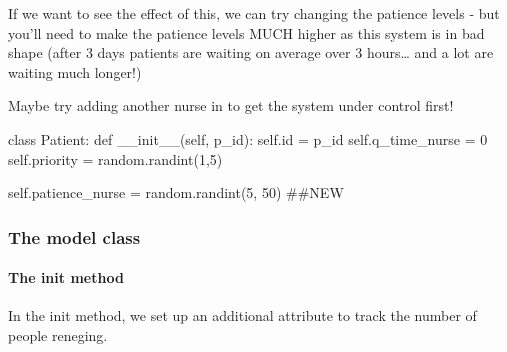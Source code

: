 \documentclass[
  letterpaper,
  DIV=11,
  numbers=noendperiod]{scrreprt}
\let\oldparagraph\paragraph
\renewcommand{\paragraph}[1]{\oldparagraph{#1}\mbox{}}
\newenvironment{Shaded}{\begin{snugshade}}{\end{snugshade}}
\newcommand{\BuiltInTok}[1]{\textcolor[rgb]{0.00,0.23,0.31}{#1}}
\newcommand{\CommentTok}[1]{\textcolor[rgb]{0.37,0.37,0.37}{#1}}
\newcommand{\DecValTok}[1]{\textcolor[rgb]{0.68,0.00,0.00}{#1}}
\newcommand{\FunctionTok}[1]{\textcolor[rgb]{0.28,0.35,0.67}{#1}}
\newcommand{\KeywordTok}[1]{\textcolor[rgb]{0.00,0.23,0.31}{#1}}
\newcommand{\NormalTok}[1]{\textcolor[rgb]{0.00,0.23,0.31}{#1}}
\newcommand{\OperatorTok}[1]{\textcolor[rgb]{0.37,0.37,0.37}{#1}}
\newcommand{\VariableTok}[1]{\textcolor[rgb]{0.07,0.07,0.07}{#1}}
\begin{document}
If we want to see the effect of this, we can try changing the patience
levels - but you'll need to make the patience levels MUCH higher as this
system is in bad shape (after 3 days patients are waiting on average
over 3 hours\ldots{} and a lot are waiting much longer!)

Maybe try adding another nurse in to get the system under control first!

\begin{Shaded}
\begin{Highlighting}[]
\KeywordTok{class}\NormalTok{ Patient:}
    \KeywordTok{def} \FunctionTok{\_\_init\_\_}\NormalTok{(}\VariableTok{self}\NormalTok{, p\_id):}
        \VariableTok{self}\NormalTok{.}\BuiltInTok{id} \OperatorTok{=}\NormalTok{ p\_id}
        \VariableTok{self}\NormalTok{.q\_time\_nurse }\OperatorTok{=} \DecValTok{0}
        \VariableTok{self}\NormalTok{.priority }\OperatorTok{=}\NormalTok{ random.randint(}\DecValTok{1}\NormalTok{,}\DecValTok{5}\NormalTok{)}

        \VariableTok{self}\NormalTok{.patience\_nurse }\OperatorTok{=}\NormalTok{ random.randint(}\DecValTok{5}\NormalTok{, }\DecValTok{50}\NormalTok{) }\CommentTok{\#\#NEW}
\end{Highlighting}
\end{Shaded}

\subsubsection{The model class}\label{the-model-class-4}

\paragraph{\texorpdfstring{The \textbf{init}
method}{The init method}}\label{the-init-method-2}

In the init method, we set up an additional attribute to track the
number of people reneging.
\end{document}
